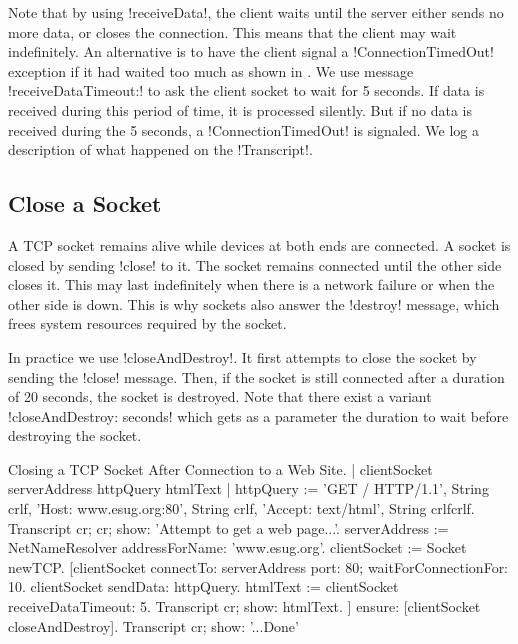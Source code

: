 \documentclass[a4paper,10pt,twoside]{book}
\begin{document}
Note that by using  \ct!receiveData!, the client waits until the server either sends no more data, or closes the connection.
This means that the client may wait indefinitely.
An alternative is to have the client signal a \ct!ConnectionTimedOut! exception if it had waited too much as shown in .
We use message \ct!receiveDataTimeout:! to ask the client socket to wait for 5 seconds.
If data is received during this period of time, it is processed silently.
But if no data is received during the 5 seconds, a \ct!ConnectionTimedOut! is signaled.
We log a description of what happened on the \ct!Transcript!.

\subsection{Close a Socket}
A TCP socket remains alive while devices at both ends are connected.
A socket is closed by sending \ct!close! to it.
The socket remains connected until the other side closes it.
This may last indefinitely when there is a network failure or when the other side is down.
This is why sockets also answer the \ct!destroy! message, which frees system resources required by the socket.

In practice we use \ct!closeAndDestroy!. It first attempts to close the socket by sending the \ct!close! message.
Then, if the socket is still connected after a duration of 20 seconds, the socket is destroyed.
Note that there exist a variant \ct!closeAndDestroy: seconds! which gets as a parameter the duration to wait before destroying the socket.

\begin{script}{Closing a TCP Socket After Connection to a Web Site.}
| clientSocket serverAddress httpQuery htmlText |
httpQuery := 'GET / HTTP/1.1', String crlf, 
	'Host: www.esug.org:80', String crlf, 
	'Accept: text/html', String crlfcrlf.
Transcript cr; cr; show: 'Attempt to get a web page...'.
serverAddress := NetNameResolver addressForName: 'www.esug.org'.
clientSocket := Socket newTCP.
[clientSocket 
	connectTo: serverAddress port: 80;
	waitForConnectionFor: 10.
 clientSocket sendData: httpQuery.
 htmlText  := clientSocket receiveDataTimeout: 5.
 Transcript cr; show: htmlText.
] ensure: [clientSocket closeAndDestroy].
Transcript cr; show: '...Done'
\end{script}
\end{document}
